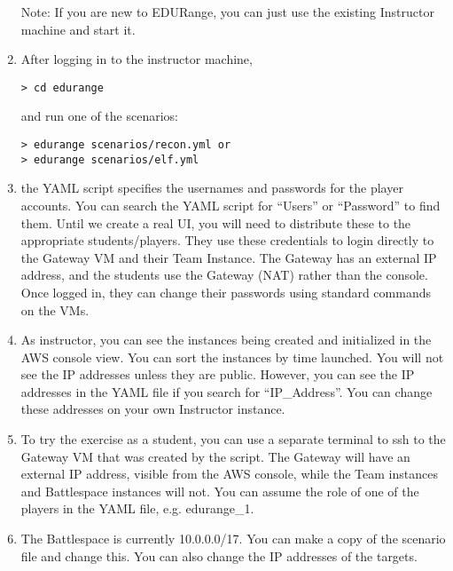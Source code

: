 \documentclass[11pt]{report}
\newcommand{\eat}[1]{}
\begin{document}
\begin{enumerate}
    Note: If you are new to EDURange, you can just use the existing Instructor machine and start it.
     \eat{The instances are on the US East cloud (N Virginia).  You can switch to 
    that in the drop down in the upper right of the window next to your name.  Then, you can
    click on running instances (there should be 0) under Resources.  }
  \item After logging in to the instructor machine, 
\begin{verbatim}
> cd edurange
\end{verbatim}
and run one of the scenarios:
\begin{verbatim}
> edurange scenarios/recon.yml or
> edurange scenarios/elf.yml 
\end{verbatim}
\item the YAML script specifies the usernames and passwords for the player accounts.  
You can search the YAML script for ``Users'' or ``Password'' to find them.  Until we create a real UI,
you will need to distribute these to the appropriate students/players.  They use these credentials
to login directly to the Gateway VM and their Team Instance.  The Gateway has an external IP address,
and the students use the Gateway (NAT) rather than the console.
 Once logged in, they can 
change their passwords using standard commands on the VMs.
\item As instructor, you can see the instances being created and initialized in the AWS console view.  
  You can sort the instances by time launched.  You will not see the IP addresses unless
  they are public.  However, you can see the IP addresses in the YAML file if you search
  for ``IP\_Address''.  You can change these addresses on your own Instructor instance.  
\item To try the exercise as a student, you can use a separate terminal to ssh to the Gateway VM
that was created by the script.  The Gateway will have an external IP address, visible
from the AWS console, while the Team %
instances and Battlespace instances will not.
You can assume the role of one of the players in the YAML file, e.g.
edurange\_1.  
\item The Battlespace is currently 10.0.0.0/17.  You can make a copy of the scenario file and change this.  You can also change the IP addresses of the targets.  

\end{enumerate}
\end{document}
